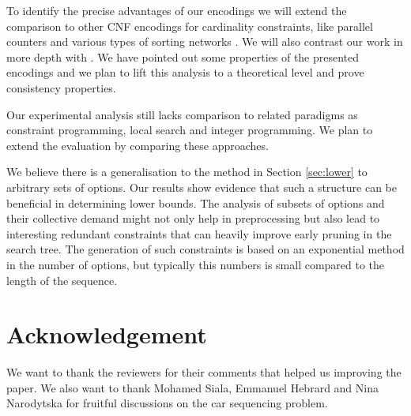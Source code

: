 \documentclass[]{llncs}
\begin{document}
To identify the precise advantages of our encodings we will extend the comparison to other CNF encodings for cardinality
constraints, like parallel counters and various types of sorting networks \cite{Codish10}\cite{Asin11}.  We will also
contrast our work in more depth with \cite{Bacchus07}.  We have pointed out some properties of the presented encodings
and we plan to lift this analysis to a theoretical level and prove consistency properties. 

Our experimental analysis still lacks comparison to related paradigms as constraint programming, local search and
integer programming.  We plan to extend the evaluation by comparing these approaches. 


We believe there is a generalisation to the method in Section \ref{sec:lower} to arbitrary sets of options. Our results
show evidence that such a structure can be beneficial in determining lower bounds. The analysis of subsets of options
and their collective demand might not only help in preprocessing but also lead to interesting redundant constraints that
can heavily improve early pruning in the search tree. The generation of such constraints is based on an exponential
method in the number of options, but typically this numbers is small compared to the length of the sequence. 

\section*{Acknowledgement}

We want to thank the reviewers for their comments that helped us improving the paper.  We also want to thank Mohamed
Siala, Emmanuel Hebrard and Nina Narodytska for fruitful discussions on the car sequencing problem. 





\end{document}
